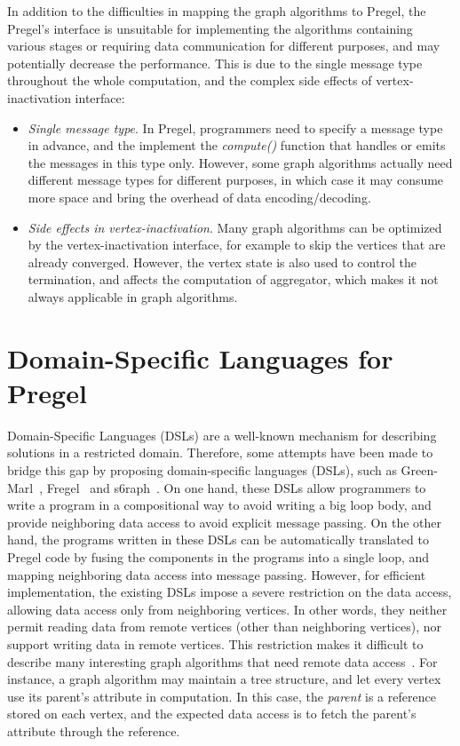 \documentclass{sokendai_thesis} %
\begin{document}
In addition to the difficulties in mapping the graph algorithms to Pregel, the Pregel's interface is unsuitable for implementing the algorithms containing various stages or requiring data communication for different purposes, and may potentially decrease the performance.
This is due to the single message type throughout the whole computation, and the complex side effects of vertex-inactivation interface:
\begin{itemize}\setlength\itemsep{0em}
\item
 \textit{Single message type}.
 In Pregel, programmers need to specify a message type in advance, and the implement the \emph{compute()} function that handles or emits the messages in this type only.
 However, some graph algorithms actually need different message types for different purposes, in which case it may consume more space and bring the overhead of data encoding/decoding.
\item
 \textit{Side effects in vertex-inactivation}.
 Many graph algorithms can be optimized by the vertex-inactivation interface, for example to skip the vertices that are already converged.
 However, the vertex state is also used to control the termination, and affects the computation of aggregator, which makes it not always applicable in graph algorithms.
\end{itemize}

\section{Domain-Specific Languages for Pregel}

Domain-Specific Languages (DSLs) are a well-known mechanism for describing solutions in a restricted domain.
Therefore, some attempts have been made to bridge this gap by proposing domain-specific languages (DSLs), such as Green-Marl~\cite{green14}, Fregel~\cite{fregel} and s6raph~\cite{s6raph}.
On one hand, these DSLs allow programmers to write a program in a compositional way to avoid writing a big loop body, and provide neighboring data access to avoid explicit message passing.
On the other hand, the programs written in these DSLs can be automatically translated to Pregel code by fusing the components in the programs into a single loop, and mapping neighboring data access into message passing.
However, for efficient implementation, the existing DSLs impose a severe restriction on the data access, allowing data access only from neighboring vertices.
In other words, they neither permit reading data from remote vertices (other than neighboring vertices), nor support writing data in remote vertices.
This restriction makes it difficult to describe many interesting graph algorithms that need remote data access~\cite{optimizing,connectivity}.
For instance, a graph algorithm may maintain a tree structure, and let every vertex use its parent's attribute in computation.
In this case, the \textit{parent} is a reference stored on each vertex, and the expected data access is to fetch the parent's attribute through the reference.
\end{document}
